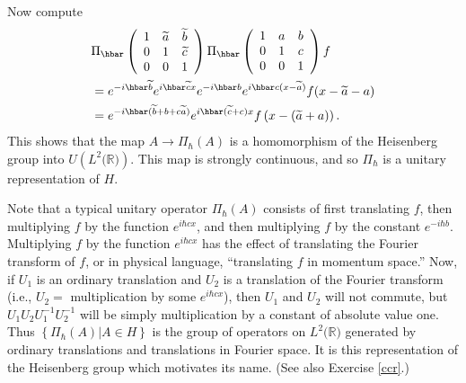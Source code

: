 \documentclass[12pt]{amsbook}
\theoremstyle{plain}
\numberwithin{equation}{chapter}
\numberwithin{theorem}{chapter}
\begin{document}
Now compute
\begin{align*}
& \Pi_{\hbar}\left(
\begin{array}
[c]{ccc}%
1 & \widetilde{a} & \widetilde{b}\\
0 & 1 & \widetilde{c}\\
0 & 0 & 1
\end{array}
\right)  \Pi_{\hbar}\left(
\begin{array}
[c]{ccc}%
1 & a & b\\
0 & 1 & c\\
0 & 0 & 1
\end{array}
\right)  f\\
& =e^{-i\hbar\widetilde{b}}e^{i\hbar\widetilde{c}x}e^{-i\hbar b}e^{i\hbar
c(x-\widetilde{a})}f(x-\widetilde{a}-a)\\
& =e^{-i\hbar(\widetilde{b}+b+c\widetilde{a})}e^{i\hbar(\widetilde{c}%
+c)x}f\left(  x-(\widetilde{a}+a)\right)  \text{.}%
\end{align*}
This shows that the map $A\rightarrow\Pi_{\hbar}(A)$ is a homomorphism of the
Heisenberg group into $U\left(  L^{2}(\mathbb{R}\mathbf{)}\right)  $. This map
is strongly continuous, and so $\Pi_{\hbar}$ is a unitary representation of
$H$.

Note that a typical unitary operator $\Pi_{\hbar}(A)$ consists of first
translating $f$, then multiplying $f$ by the function $e^{i\hbar cx}$, and
then multiplying $f$ by the constant $e^{-i\hbar b}$. Multiplying $f$ by the
function $e^{i\hbar cx}$ has the effect of translating the Fourier transform
of $f$, or in physical language, ``translating $f$ in momentum space.'' Now,
if $U_{1}$ is an ordinary translation and $U_{2}$ is a translation of the
Fourier transform (i.e., $U_{2}=$ multiplication by some $e^{i\hbar cx}$),
then $U_{1}$ and $U_{2}$ will not commute, but $U_{1}U_{2}U_{1}^{-1}U_{2}%
^{-1}$ will be simply multiplication by a constant of absolute value one. Thus
$\left\{  \Pi_{\hbar}(A)\left|  A\in H\right.  \right\}  $ is the group of
operators on $L^{2}(\mathbb{R}\mathbf{)}$ generated by ordinary translations
and translations in Fourier space. It is this representation of the Heisenberg
group which motivates its name. (See also Exercise \ref{ccr}.)
\end{document}
